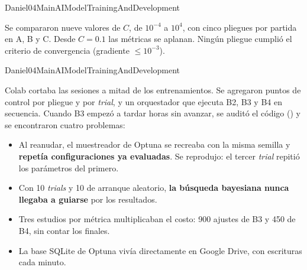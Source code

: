 
%
       {Daniel}{04MainAIModelTrainingAndDevelopment}

Se compararon nueve valores de $C$, de $10^{-4}$ a $10^{4}$, con cinco
pliegues por partida en A, B y C. Desde $C = 0.1$ las m\'etricas se aplanan.
Ning\'un pliegue cumpli\'o el criterio de convergencia (gradiente
$\le 10^{-3}$).



%
       {Daniel}{04MainAIModelTrainingAndDevelopment}

Colab cortaba las sesiones a mitad de los entrenamientos. Se agregaron
puntos de control por pliegue y por \textit{trial}, y un orquestador que
ejecuta B2, B3 y B4 en secuencia. Cuando B3 empez\'o a tardar horas sin
avanzar, se audit\'o el c\'odigo ()
y se encontraron cuatro problemas:

\begin{itemize}
  \item Al reanudar, el muestreador de Optuna se recreaba con la misma
        semilla y \textbf{repet\'ia configuraciones ya evaluadas}. Se
        reprodujo: el tercer \textit{trial} repiti\'o los par\'ametros del
        primero.
  \item Con 10 \textit{trials} y 10 de arranque aleatorio, \textbf{la
        b\'usqueda bayesiana nunca llegaba a guiarse} por los resultados.
  \item Tres estudios por m\'etrica multiplicaban el costo: 900 ajustes de
        B3 y 450 de B4, sin contar los finales.
  \item La base SQLite de Optuna viv\'ia directamente en Google Drive, con
        escrituras cada minuto.
\end{itemize}

